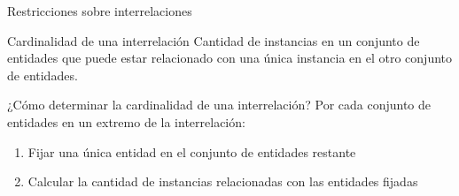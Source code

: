 
\begin{frame}{Restricciones sobre interrelaciones}

    \begin{block}{Cardinalidad de una interrelaci\'on}
        Cantidad de instancias en un conjunto de entidades que
        puede estar relacionado con una \'unica instancia en el otro
        conjunto de entidades.
    \end{block}

    \pause

    \begin{block}{¿C\'omo determinar la cardinalidad de una interrelaci\'on?}
        Por cada conjunto de entidades en un extremo de la interrelaci\'on: \begin{enumerate}
            \item Fijar una \'unica entidad en el conjunto de entidades restante
            \item Calcular la cantidad de instancias relacionadas con las entidades fijadas
        \end{enumerate}
    \end{block}
\end{frame}

